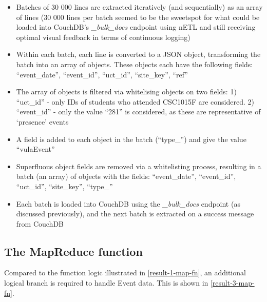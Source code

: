 \begin{itemize}
    \item Batches of 30 000 lines are extracted iteratively (and sequentially) as an array of lines (30 000 lines per batch seemed to be the sweetspot for what could be loaded into CouchDB's \textit{\_bulk\_docs} endpoint using nETL and still receiving optimal visual feedback in terms of continuous logging)
    \item Within each batch, each line is converted to a JSON object, transforming the batch into an array of objects. These objects each have the following fields: ``event\_date'', ``event\_id'', ``uct\_id'',  ``site\_key'', ``ref''
    \item The array of objects is filtered via whitelising objects on two fields: 1) ``uct\_id'' - only IDs of students who attended CSC1015F are considered. 2) ``event\_id'' - only the value ``281'' is considered, as these are representative of `presence' events
    \item A field is added to each object in the batch (``type\_'') and give the value ``vulaEvent''
    \item Superfluous object fields are removed via a whitelisting process, resulting in a batch (an array) of objects with the fields: ``event\_date'', ``event\_id'', ``uct\_id'', ``site\_key'', ``type\_''
    \item Each batch is loaded into CouchDB using the \textit{\_bulk\_docs} endpoint (as discussed previously), and the next batch is extracted on a success message from CouchDB
\end{itemize}

\subsection*{The MapReduce function}
Compared to the function logic illustrated in \ref{result-1-map-fn}, an additional logical branch is required to handle Event data. This is shown in \ref{result-3-map-fn}.

